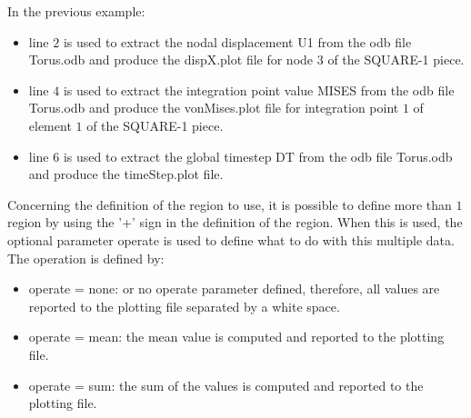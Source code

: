 In the previous example:
\begin{itemize}
\item line $2$ is used to extract the nodal displacement \textsf{U1} from
the odb file \textsf{Torus.odb} and produce the \textsf{dispX.plot}
file for node $3$ of the \textsf{SQUARE-1} piece.
\item line $4$ is used to extract the integration point value \textsf{MISES}
from the odb file \textsf{Torus.odb} and produce the \textsf{vonMises.plot}
file for integration point $1$ of element $1$ of the \textsf{SQUARE-1}
piece.
\item line $6$ is used to extract the global timestep \textsf{DT} from
the odb file \textsf{Torus.odb} and produce the \textsf{timeStep.plot}
file.
\end{itemize}
Concerning the definition of the region to use, it is possible to
define more than $1$ region by using the \textsf{'+'} sign in the
definition of the region. When this is used, the optional parameter
operate is used to define what to do with this multiple data. The
operation is defined by:
\begin{itemize}
\item \textsf{operate = none}: or no operate parameter defined, therefore,
all values are reported to the plotting file separated by a white
space.
\item \textsf{operate = mean}: the mean value is computed and reported to
the plotting file.
\item \textsf{operate = sum}: the sum of the values is computed and reported
to the plotting file.
\end{itemize}

